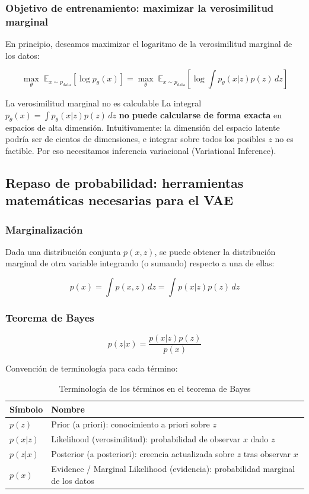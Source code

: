 \documentclass[a4paper]{article}
\begin{document}
\subsubsection{Objetivo de entrenamiento: maximizar la verosimilitud marginal}

En principio, deseamos maximizar el logaritmo de la verosimilitud marginal de los datos:

$$\max_\theta \; \mathbb{E}_{x \sim p_{\text{data}}} [\log p_\theta(x)] = \max_\theta \; \mathbb{E}_{x \sim p_{\text{data}}} \left[\log \int p_\theta(x|z) p(z) \, dz \right]$$

\begin{warningbox}{La verosimilitud marginal no es calculable}
La integral $p_\theta(x) = \int p_\theta(x|z) p(z) \, dz$ \textbf{no puede calcularse de forma exacta} en espacios de alta dimensión. Intuitivamente: la dimensión del espacio latente podría ser de cientos de dimensiones, e integrar sobre todos los posibles $z$ no es factible. Por eso necesitamos inferencia variacional (Variational Inference).
\end{warningbox}

\subsection{Repaso de probabilidad: herramientas matemáticas necesarias para el VAE}

\subsubsection{Marginalización}

Dada una distribución conjunta $p(x, z)$, se puede obtener la distribución marginal de otra variable integrando (o sumando) respecto a una de ellas:

$$p(x) = \int p(x, z) \, dz = \int p(x|z) p(z) \, dz$$

\subsubsection{Teorema de Bayes}

$$p(z|x) = \frac{p(x|z) p(z)}{p(x)}$$

Convención de terminología para cada término:

\begin{table}[H]
\centering
\begin{tabular}{ll}
\toprule
Símbolo & Nombre \\
\midrule
$p(z)$ & Prior (a priori): conocimiento a priori sobre $z$ \\
$p(x|z)$ & Likelihood (verosimilitud): probabilidad de observar $x$ dado $z$ \\
$p(z|x)$ & Posterior (a posteriori): creencia actualizada sobre $z$ tras observar $x$ \\
$p(x)$ & Evidence / Marginal Likelihood (evidencia): probabilidad marginal de los datos \\
\bottomrule
\end{tabular}
\caption{Terminología de los términos en el teorema de Bayes}
\end{table}
\end{document}
